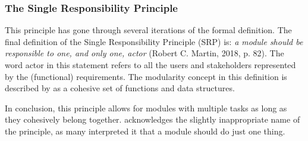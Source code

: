\subsubsection{The Single Responsibility Principle} \label{subsubsec_srp}

This principle has gone through several iterations of the formal definition. The final
definition of the Single Responsibility Principle (SRP) is: \textit{a module should be
responsible to one, and only one, actor} (Robert C. Martin, 2018, p. 82). The word actor
in this statement refers to all the users and stakeholders represented by the (functional)
requirements. The modularity concept in this definition is described by
\textcite[82]{robert_c_martin_clean_2018} as a cohesive set of functions and data
structures. 

In conclusion, this principle allows for modules with multiple tasks as long as they
cohesively belong together. \textcite[81]{robert_c_martin_clean_2018} acknowledges the
slightly inappropriate name of the principle, as many interpreted it that a module should
do just one thing.
